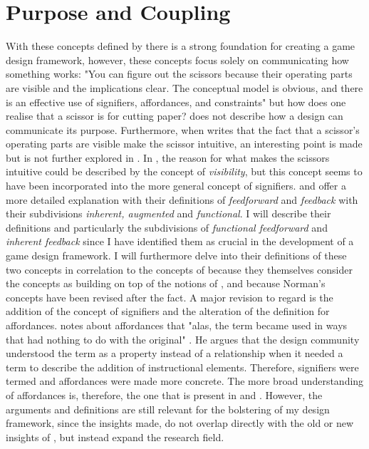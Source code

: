 \section{Purpose and Coupling}
With these concepts defined by  there is a strong foundation for creating a game design framework, however, these concepts focus solely on communicating how something works: "You can figure out the scissors because their operating parts are visible and the implications clear. The conceptual model is obvious, and there is an effective use of signifiers, affordances, and constraints" \cite[p. 27]{norman} but how does one realise that a scissor is for cutting paper?  does not describe how a design can communicate its purpose. Furthermore, when  writes that the fact that a scissor's operating parts are visible make the scissor intuitive, an interesting point is made but is not further explored in . In , the reason for what makes the scissors intuitive could be described by the concept of \textit{visibility}, but this concept seems to have been incorporated into the more general concept of signifiers.  and  offer a more detailed explanation with their definitions of \textit{feedforward} and \textit{feedback} with their subdivisions \textit{inherent, augmented} and \textit{functional}. I will describe their definitions and particularly the subdivisions of \textit{functional feedforward} and \textit{inherent feedback} since I have identified them as crucial in the development of a game design framework. I will furthermore delve into their definitions of these two concepts in correlation to the concepts of  because they themselves consider the concepts as building on top of the notions of , and because Norman's concepts have been revised \cite{norman} after the fact. A major revision to regard is the addition of the concept of signifiers and the alteration of the definition for affordances.  notes about affordances that "alas, the term became used in ways that had nothing to do with the original" \cite[p. 13]{norman}. He argues that the design community understood the term as a property instead of a relationship when it needed a term to describe the addition of instructional elements. Therefore, signifiers were termed and affordances were made more concrete. The more broad understanding of affordances is, therefore, the one that is present in  and . However, the arguments and definitions are still relevant for the bolstering of my design framework, since the insights made, do not overlap directly with the old or new insights of , but instead expand the research field.

